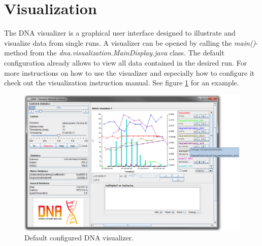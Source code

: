 \section{Visualization}
The DNA visualizer is a graphical user interface designed to illustrate and visualize data from single runs. A visualizer can be opened by calling the \textit{main()}-method from the \textit{dna.visualization.MainDisplay.java} class. The default configuration already allows to view all data contained in the desired run. For more instructions on how to use the visualizer and especially how to configure it check out the visualization instruction manual. See figure \ref{fig:vis} for an example.

\begin{figure} [h]
\centering
\includegraphics [scale=0.5] {images/vis-ex}
\caption{Default configured DNA visualizer.}
\label{fig:vis}
\end{figure}